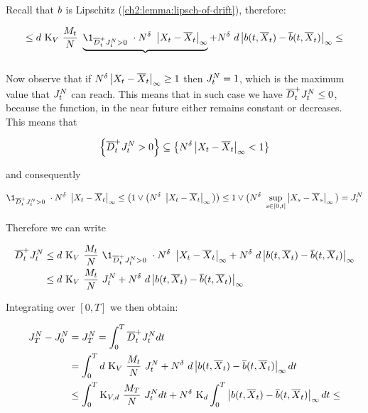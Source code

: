 Recall that $b$ is Lipschitz (\ref{ch2:lemma:lipsch-of-drift}), therefore:

\begin{align*}
	\leq
	  d\
	  \const_\attraction\
	  \frac{\hmactive_t}{N}\
	  \underbrace{
		  \1_{\diniu^+_t \auxProc_t^N >0 }\
		   \cdot 
		   N^{\cutparameter}\
		   \norm{\sol_t - \mfsol_t}_\infty
	   }_{}
	     + N^{\cutparameter}\
	     d\norm{\drift(t, \mfsol_t) - \mfdrift(t, \mfsol_t)}_\infty \leq
\end{align*}

Now observe that if $N^{\delta}\left| X_t - \overline{X}_t \right|_\infty \geq 1$ then $J_t^N =1$, which is the maximum value that $J_t^N$ can reach.
This means that in such case we have $\overline{D}^+_tJ_t^N \leq 0$, because the function, in the near future either remains constant or decreases.
This means that

\begin{equation*}
	\left\{
		\overline{D}^+_t J_t^N >0 
	\right\} 
	\subseteq 
	\left\{
		N^{\delta}\left| X_t - \overline{X}_t \right|_\infty < 1
	\right\} 
\end{equation*}

and consequently 

\begin{equation*}
		\1_{\diniu^+_t \auxProc_t^N >0 }\
		\cdot 
		N^{\cutparameter}\
		\norm{\sol_t - \mfsol_t}_\infty
	\leq
		\left(
			1
			\vee
			\big(
			N^{\cutparameter}\
			\norm{\sol_t - \mfsol_t}_\infty
			\big)
		\right)
	\leq
		1
		\vee
		\big(
		N^{\cutparameter}\
		\sup_{s\in[0,t]} \norm{\sol_s - \mfsol_s}_\infty
		\big)
	=
		\auxProc_t^N 
\end{equation*}

Therefore we can write

\begin{align*}
	\diniu^+_t \auxProc_t^N 
	&\leq
	d\
	\const_\attraction\
	\frac{\hmactive_t}{N}\
		\1_{\diniu^+_t \auxProc_t^N >0 }\
		\cdot 
		N^{\cutparameter}\
		\norm{\sol_t - \mfsol_t}_\infty
	+ N^{\cutparameter}\
	d\norm{\drift(t, \mfsol_t) - \mfdrift(t, \mfsol_t)}_\infty 
	\\
	&\leq
	d\
	\const_\attraction\
	\frac{\hmactive_t}{N}\
	\auxProc_t^N 
	+N^{\cutparameter}\
	d\norm{\drift(t, \mfsol_t) - \mfdrift(t, \mfsol_t)}_\infty 
\end{align*}

Integrating over $[0,T]$ we then obtain:

\begin{align*}
	 J_T^N - J_0^N &= J_T^N = \int_0^T \overline{D}^+_t J_t^N dt
	 \\
	 &= \int_0^T 
	 	d\
	 	\text{K}_V\
	 	\frac{M_t}{N}\
	 	J_t^N 
	 	+N^{\delta}\
	 	 d\left| b(t, \overline{X}_t) - \overline{b}(t, \overline{X}_t) \right|_\infty 
	 	dt
	 	\\
	 	& \leq
	\int_0^T 
	\text{K}_{V,d}\
	\frac{M_T}{N}\
	J_t^N dt
	+ 
	N^{\delta}\
	\text{K}_d
		\int_0^T 
		\left| b(t, \overline{X}_t) - \overline{b}(t, \overline{X}_t) \right|_\infty 
		dt
	\leq
\end{align*}

